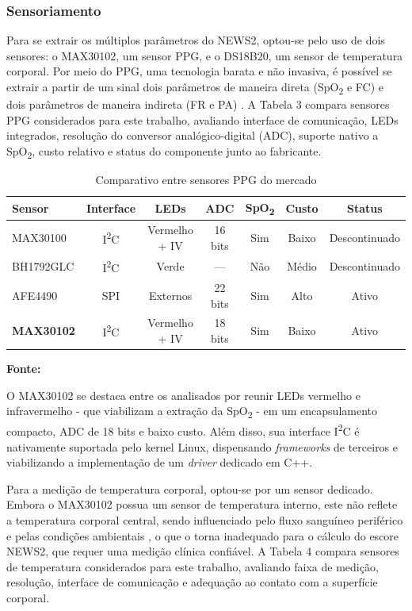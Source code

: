 \subsubsection{Sensoriamento}

Para se extrair os múltiplos parâmetros do NEWS2, optou-se pelo uso de dois sensores: o MAX30102, um sensor PPG, e o DS18B20, um sensor de temperatura corporal. Por meio do PPG, uma tecnologia barata e não invasiva, é possível se extrair a partir de um sinal dois parâmetros de maneira direta (SpO\textsubscript{2} e FC) e dois parâmetros de maneira indireta (FR e PA) \cite{allen2007photoplethysmography}. A Tabela 3 compara sensores PPG considerados para este trabalho, avaliando interface de comunicação, LEDs integrados, resolução do conversor analógico-digital (ADC), suporte nativo a SpO\textsubscript{2}, custo relativo e status do componente junto ao fabricante.

\begin{table}[H]
\centering
\caption{Comparativo entre sensores PPG do mercado}
\label{tableComparativoSensoresPPG}
\begin{tabular}{ |l|c|c|c|c|c|c| }
    \hline
    \textbf{Sensor} & \textbf{Interface} & \textbf{LEDs} & \textbf{ADC} & \textbf{SpO\textsubscript{2}} & \textbf{Custo} & \textbf{Status} \\
    \hline
    MAX30100 & I\textsuperscript{2}C & Vermelho + IV & 16 bits & Sim & Baixo & Descontinuado \\
    BH1792GLC & I\textsuperscript{2}C & Verde & --- & Não & Médio & Descontinuado \\
    AFE4490 & SPI & Externos & 22 bits & Sim & Alto & Ativo \\
    \textbf{MAX30102} & I\textsuperscript{2}C & Vermelho + IV & 18 bits & Sim & Baixo & Ativo \\
    \hline
\end{tabular}
{\footnotesize \textbf{Fonte: \cite{max30100} \cite{bh1792glc} \cite{afe4490} \cite{max30102} }}
\end{table}

O MAX30102 se destaca entre os analisados por reunir LEDs vermelho e infravermelho - que viabilizam a extração da SpO\textsubscript{2} - em um encapsulamento compacto, ADC de 18 bits e baixo custo. Além disso, sua interface I\textsuperscript{2}C é nativamente suportada pelo kernel Linux, dispensando \textit{frameworks} de terceiros e viabilizando a implementação de um \textit{driver} dedicado em C++.

Para a medição de temperatura corporal, optou-se por um sensor dedicado. Embora o MAX30102 possua um sensor de temperatura interno, este não reflete a temperatura corporal central, sendo influenciado pelo fluxo sanguíneo periférico e pelas condições ambientais \cite{sadeghi2025wearable}, o que o torna inadequado para o cálculo do escore NEWS2, que requer uma medição clínica confiável. A Tabela 4 compara sensores de temperatura considerados para este trabalho, avaliando faixa de medição, resolução, interface de comunicação e adequação ao contato com a superfície corporal.

